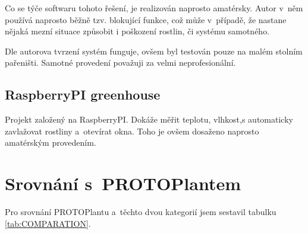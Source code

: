 Co se týče softwaru tohoto řešení, je realizován naprosto amatérsky.
Autor v~něm používá naprosto běžně tzv. blokující funkce, což může v~případě, že nastane nějaká mezní situace způsobit i poškození rostlin, či systému samotného.

Dle autorova tvrzení systém funguje, ovšem byl testován pouze na malém stolním pařeništi.
Samotné provedení považuji za velmi neprofesionální.

\subsection{RaspberryPI greenhouse \cite{RPIGREENHOUSE}}
Projekt založený na RaspberryPI. 
Dokáže měřit teplotu, vlhkost,s automaticky zavlažovat rostliny a~otevírat okna.
Toho je ovšem dosaženo naprosto amatérským provedením.

\section{Srovnání s~PROTOPlantem}
Pro srovnání PROTOPlantu a~těchto dvou kategorií jsem sestavil tabulku \ref{tab:COMPARATION}.

